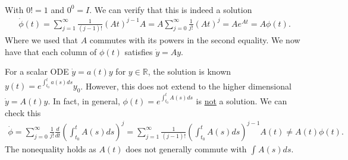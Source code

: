\begin{itemize}
\begin{enumerate}
\begin{align}
		\end{align}
	With $0! =1$ and ${0} ^{0}= {I} $. We can verify that this is indeed a solution
	\begin{align}
		\dot{\phi}(t) = \sum_{j=1}^{\infty } \frac{1}{(j-1)!} ({A} t)^{j-1}{A} = {A} \sum_{j=0}^{\infty } \frac{1}{j!} ({A} t)^{j} = {A}  e^{{A} t} = {A} \phi(t).
	\end{align}
	Where we used that ${A} $ commutes with its powers in the second equality. We now have that each column of $\phi(t)$ satisfies $\dot{{y} } = {A} {y} $.	
	\begin{remark}[]
		For a scalar ODE $\dot{y}= a(t)y$ for $y \in \mathbb{R}$, the solution is known $y(t) = e^{\int_{t_0}^{t} a(s)ds}y_0$. However, this does not extend to the higher dimensional $\dot{{y} }= {A} (t){y} $. In fact, in general, $\phi(t) = e^{\int_{t_0}^{t} {A} (s)ds}$ is \underline{not} a solution. We can check this
	\begin{align}
		\dot{\phi} = \sum_{j=0}^{\infty } \frac{1}{j!} \frac{d}{dt} \left( \int_{t_0}^{t} {A} (s) ds \right)^{j} = \sum_{j=1}^{\infty } \frac{1}{(j-1)!} \left( \int_{t_0}^{t} {A} (s)ds \right)^{j-1} {A} (t) \neq {A} (t) \phi(t).
	\end{align}
	The nonequality holds as ${A} (t)$ does not generally commute with $\int_{}^{} {A} (s)ds$.
	\end{remark}


\end{enumerate}
\end{itemize}
